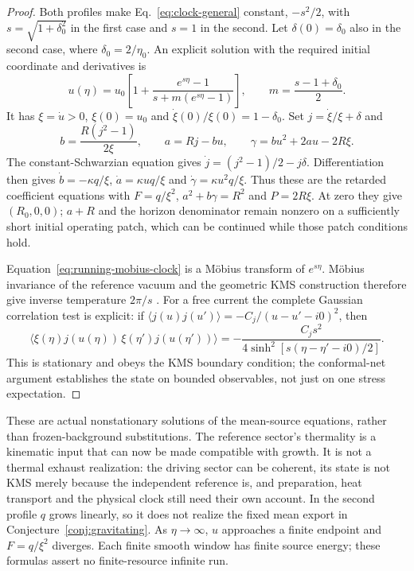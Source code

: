 \documentclass[12pt,a4paper]{article}
\begin{document}
\begin{proof}
Both profiles make Eq.~\eqref{eq:clock-general} constant, $-s^2/2$,
with $s=\sqrt{1+\delta_0^2}$ in the first case and $s=1$ in the second.
Let $\delta(0)=\delta_0$ also in the second case, where
$\delta_0=2/\eta_0$. An explicit solution with the required initial
coordinate and derivatives is
\begin{equation}\label{eq:running-mobius-clock}
 u(\eta)=u_0\left[1+\frac{e^{s\eta}-1}
 {s+m(e^{s\eta}-1)}\right],\qquad
 m=\frac{s-1+\delta_0}{2}.
\end{equation}
It has $\xi=\dot u>0$, $\xi(0)=u_0$ and
$\dot\xi(0)/\xi(0)=1-\delta_0$. Set $j=\dot\xi/\xi+\delta$ and
\[
 b=\frac{R(j^2-1)}{2\xi},\qquad a=Rj-bu,\qquad
 \gamma=bu^2+2au-2R\xi.
\]
The constant-Schwarzian equation gives
$\dot j=(j^2-1)/2-j\delta$.
Differentiation then gives
$\dot b=-\kappa q/\xi$, $\dot a=\kappa uq/\xi$ and
$\dot\gamma=\kappa u^2q/\xi$.
Thus these are the retarded coefficient equations with
$F=q/\xi^2$, $a^2+b\gamma=R^2$ and $P=2R\xi$.
At zero they give $(R_0,0,0)$; $a+R$ and the horizon denominator remain
nonzero on a sufficiently short initial operating patch, which can be
continued while those patch conditions hold.

Equation~\eqref{eq:running-mobius-clock} is a M\"obius transform of
$e^{s\eta}$. M\"obius invariance of the reference vacuum and the geometric
KMS construction therefore give inverse temperature $2\pi/s$
\cite[Sec.~2.8, Proposition~2.4 and Theorem~2.5]{Camassa2012KMS}.
For a free current the complete Gaussian correlation test is explicit:
if $\langle j(u)j(u')\rangle=-C_j/(u-u'-i0)^2$, then
\[
 \langle \xi(\eta)j(u(\eta))\,\xi(\eta')j(u(\eta'))\rangle
 =-\frac{C_js^2}{4\sinh^2[s(\eta-\eta'-i0)/2]}.
\]
This is stationary and obeys the KMS boundary condition; the conformal-net
argument establishes the state on bounded observables, not just on one
stress expectation.
\end{proof}

These are actual nonstationary solutions of the mean-source equations, rather
than frozen-background substitutions. The reference sector's thermality is a
kinematic input that can now be made compatible with growth. It is not a
thermal exhaust realization: the driving sector can be coherent, its state
is not KMS merely because the independent reference is, and preparation,
heat transport and the physical clock still need their own account. In the
second profile $q$ grows linearly, so it does not realize the fixed mean
export in Conjecture~\ref{conj:gravitating}. As $\eta\to\infty$, $u$ approaches
a finite endpoint and $F=q/\xi^2$ diverges. Each finite smooth window has
finite source energy; these formulas assert no finite-resource infinite run.
\end{document}
